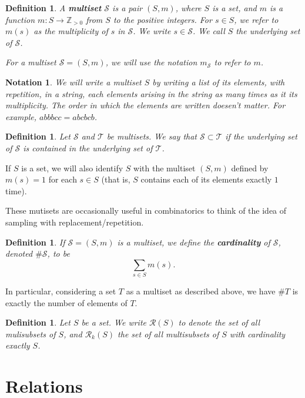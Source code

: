 \documentclass[12pt]{report}
\theoremstyle{plain}
\newtheorem{defn}[thm]{Definition}
\newtheorem{notn}[thm]{Notation}
\newcommand{\ms}[1]{\mathscr #1}
\newcommand{\Xb}[1]{\textbf{#1}\index{#1}}
\begin{document}
\begin{defn}
A \Xb{multiset} $\ms S$ is a pair $(S, m)$, where $S$ is a set, and $m$ is a
function $m: S \to \mathbb Z_{> 0}$ from $S$ to the positive integers. For
$s \in S$, we refer to $m(s)$ as the multiplicity of $s$ in $\ms S$. We
write $s \in \ms S$. We call $S$ the underlying set of $\ms S$.

For a multiset $\ms S = (S, m)$, we will use the notation $m_{\ms S}$ to
refer to $m$.
\end{defn}

\begin{notn}
We will write a multiset $S$ by writing a list of its elements, with
repetition, in a string, each elements arising in the string as many times
as it its multiplicity. The order in which the elements are written
doesen't matter. For example, $abbbcc = abcbcb$.
\end{notn}

\begin{defn}
Let $\ms S$ and $\ms T$ be multisets. We say that $\ms S \subset \ms T$ if
the underlying set of $\ms S$ is contained in the underlying set of $\ms
T$.
\end{defn}

If $S$ is a set, we will also identify $S$ with the multiset $(S, m)$
defined by $m(s) = 1$ for each $s \in S$ (that is, $S$ contains each of its
elements exactly $1$ time).

These mutisets are occasionally useful in combinatorics to think of the
idea of sampling with replacement/repetition.

\begin{defn}
If $\ms S = (S, m)$ is a multiset, we define the \Xb{cardinality} of $\ms
S$, denoted  $\#\ms S$, to be
\[ \sum_{s \in S} m(s). \]
\end{defn}
In particular, considering a set $T$ as a multiset as described above, we
have $\# T$ is exactly the number of elements of $T$.

\begin{defn} \label{multisubsets definition}
Let $S$ be a set. We write $\ms R(S)$ to denote the set of all mulisubsets
of $S$, and $\ms R_k(S)$ the set of all multisubsets of $S$ with
cardinality exactly $S$.
\end{defn}


\section{Relations}
\end{document}
